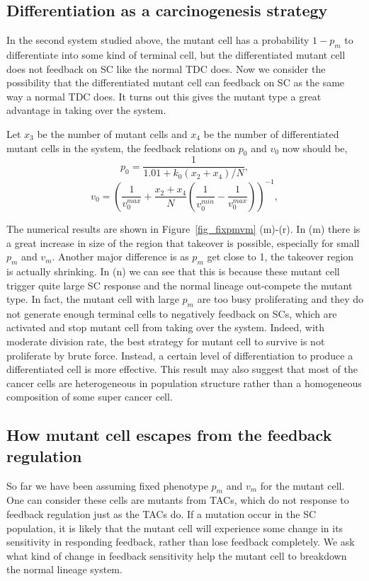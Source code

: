 \documentclass[12pt]{article}
\begin{document}
\subsection*{Differentiation as a carcinogenesis strategy}
In the second system studied above, 
the mutant cell has a probability $1-p_m$
to differentiate into some kind of terminal cell, 
but the differentiated mutant cell does not feedback on 
SC like the normal TDC does. 
Now we consider the possibility that the differentiated mutant cell
can feedback on SC as the same way a normal TDC does.
It turns out this gives the mutant type a great advantage
in taking over the system.

Let $x_3$ be the number of mutant cells and $x_4$ be the 
number of differentiated mutant cells in the system,
the feedback relations on $p_0$ and $v_0$ now should be,
\begin{equation}
p_0 = \frac{1}{1.01+k_0 (x_2+x_4) / N},
\label{feedp0e}
\end{equation}
\begin{equation}
v_0 = \left( \frac{1}{v_0^{max}} + \frac{x_2+x_4}{N}
\left( \frac{1}{v_0^{min}} - \frac{1}{v_0^{max}}\right) \right)^{-1},
\label{feedv0e}
\end{equation}

The numerical results are shown in Figure~\ref{fig_fixpmvm} (m)-(r).
In (m) there is a great increase in size of the region that
takeover is possible, especially for small $p_m$ and $v_m$.
Another major difference is as $p_m$ get close to 1, the
takeover region is actually shrinking. In (n) we can see 
that this is because these mutant cell trigger quite large
SC response and the normal lineage out-compete the mutant type. 
In fact, the mutant cell with large $p_m$   
are too busy proliferating and they do not generate 
enough terminal cells to negatively feedback on SCs, 
which are activated and stop mutant cell from taking over 
the system. Indeed, with moderate division rate, 
the best strategy for mutant cell to survive is not proliferate 
by brute force. Instead, a certain level of differentiation 
to produce a differentiated cell is more effective. 
This result may also suggest that most of the cancer 
cells are heterogeneous in population structure rather 
than a homogeneous composition of some super cancer cell.

\subsection*{How mutant cell escapes from the feedback regulation}
So far we have been assuming fixed phenotype $p_m$ and $v_m$ for
the mutant cell. One can consider these cells are mutants from TACs,
which do not response to feedback regulation just as the TACs do.
If a mutation occur in the SC population, it is likely that
the mutant cell will experience some change in its sensitivity
in responding feedback, rather than lose feedback completely.
We ask what kind of change in feedback sensitivity help
the mutant cell to breakdown the normal lineage system.
\end{document}
